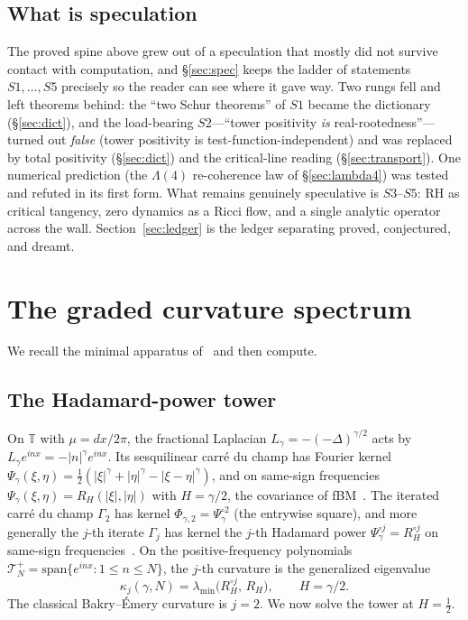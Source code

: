 \documentclass[11pt,reqno]{amsart}
\theoremstyle{plain}
\theoremstyle{definition}
\theoremstyle{remark}
\newcommand{\T}{\mathbb T}
\newcommand{\Had}{\circ}
\begin{document}
\subsection{What is speculation}
The proved spine above grew out of a speculation that mostly did not
survive contact with computation, and \S\ref{sec:spec} keeps the ladder
of statements $S1,\dots,S5$ precisely so the reader can see where it gave
way. Two rungs fell and left theorems behind: the ``two Schur theorems''
of $S1$ became the dictionary (\S\ref{sec:dict}), and the load-bearing
$S2$---``tower positivity \emph{is} real-rootedness''---turned out
\emph{false} (tower positivity is test-function-independent) and was
replaced by total positivity (\S\ref{sec:dict}) and the critical-line
reading (\S\ref{sec:transport}). One numerical prediction (the $\Lambda(4)$
re-coherence law of \S\ref{sec:lambda4}) was tested and refuted in its
first form. What remains genuinely speculative is $S3$--$S5$: RH as
critical tangency, zero dynamics as a Ricci flow, and a single analytic
operator across the wall. Section~\ref{sec:ledger} is the ledger
separating proved, conjectured, and dreamt.

\section{The graded curvature spectrum}\label{sec:graded}

We recall the minimal apparatus of~\cite{FontesBE} and then compute.

\subsection{The Hadamard-power tower}
On $\T$ with $\mu=dx/2\pi$, the fractional Laplacian
$L_\gamma=-(-\Delta)^{\gamma/2}$ acts by $L_\gamma e^{inx}=-|n|^\gamma
e^{inx}$. Its sesquilinear carr\'e du champ has Fourier kernel
$\Psi_\gamma(\xi,\eta)=\tfrac12(|\xi|^\gamma+|\eta|^\gamma-|\xi-\eta|^\gamma)$,
and on same-sign frequencies $\Psi_\gamma(\xi,\eta)=R_{H}(|\xi|,|\eta|)$
with $H=\gamma/2$, the covariance of fBM~\cite{FontesBE,Mishura}. The
iterated carr\'e du champ $\Gamma_2$ has kernel
$\Phi_{\gamma,2}=\Psi_\gamma^{\Had2}$ (the entrywise square), and more
generally the $j$-th iterate $\Gamma_j$ has kernel the $j$-th Hadamard
power $\Psi_\gamma^{\Had j}=R_H^{\Had j}$ on same-sign
frequencies~\cite{FontesBE}. On the positive-frequency polynomials
$\mathcal T_N^+=\mathrm{span}\{e^{inx}:1\le n\le N\}$, the $j$-th
curvature is the generalized eigenvalue
\begin{equation}\label{eq:kappa-j}
   \kappa_j(\gamma,N)=\lambda_{\min}\!\bigl(R_H^{\Had j},\,R_H\bigr),
   \qquad H=\gamma/2 .
\end{equation}
The classical Bakry--\'Emery curvature is $j=2$. We now solve the tower
at $H=\tfrac12$.
\end{document}
